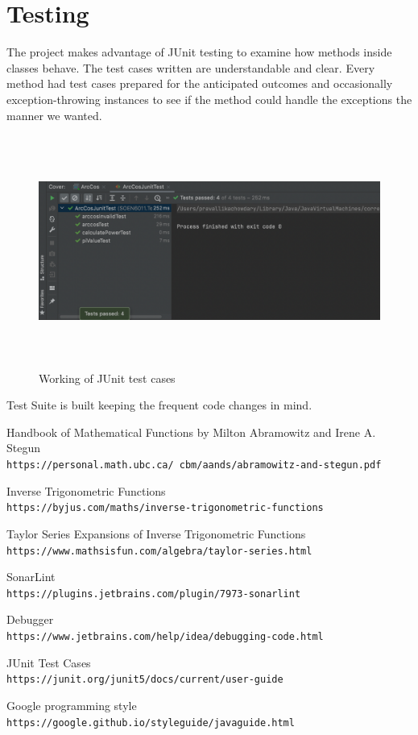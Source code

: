 \documentclass{article}
\begin{document}
    \section{Testing}
    The project makes advantage of JUnit testing to examine how methods inside classes behave. The test cases written are understandable and clear. Every method had test cases prepared for the anticipated outcomes and occasionally exception-throwing instances to see if the method could handle the exceptions the manner we wanted.
    \begin{figure}
        \centering
        \includegraphics[width=5.0in,height=3.0in]{Images/Junit.png}
        \caption{Working of JUnit test cases}
        \label{fig:Speed vs. Torque from Pittman}
    \end{figure}
    Test Suite is built keeping the frequent code changes in mind.\\
    \begin{thebibliography}{9}
        Handbook of Mathematical Functions by Milton Abramowitz and
        Irene A. Stegun
        \\\texttt{https://personal.math.ubc.ca/~cbm/aands/abramowitz-and-stegun.pdf}

        Inverse Trigonometric Functions
        \\\texttt{https://byjus.com/maths/inverse-trigonometric-functions}

        Taylor Series Expansions of Inverse Trigonometric Functions
        \\\texttt{https://www.mathsisfun.com/algebra/taylor-series.html}

        SonarLint
        \\\texttt{https://plugins.jetbrains.com/plugin/7973-sonarlint}

        Debugger
        \\\texttt{https://www.jetbrains.com/help/idea/debugging-code.html}

        JUnit Test Cases
        \\\texttt{https://junit.org/junit5/docs/current/user-guide}

        Google programming style
        \\\texttt{https://google.github.io/styleguide/javaguide.html}
    \end{thebibliography}
\end{document}

